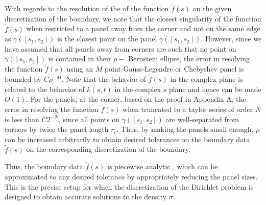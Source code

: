 \documentclass[12pt]{article}
\begin{document}
With regards to the resolution of the of the function $\tilde{f}(s)$ on the given discretization of the boundary, 
we note that the closest singularity of the function $\tilde{f}(s)$ when restricted to a panel away from the corner
and not on the same edge as $\gamma([s_{1},s_{2}])$ is the closest point on the panel $\gamma([s_{1},s_{2}])$. 
However, since we have assumed that all panels away from corners are such that no point on $\gamma([s_{1},s_{2}])$ 
is contained in their $\rho-$ Bernstein ellipse, the error in resolving the function $\tilde{f}(s)$ using an $M$ point Gauss-Legendre
or Chebyshev panel is bounded by $C \rho^{-M}$. Note that the behavior of $\tilde{f}(s)$ in the complex plane is related
to the behavior of $k(s,t)$ in the complex $s$ plane and hence can be made $O(1)$.
For the panels, at the corner, based on the proof in Appendix A, the error in resolving the function $\tilde{f}(s)$ when
truncated to a taylor series of order $N$ is less than $C 2^{-N}$, since all points on $\gamma([s_{1},s_{2}])$ are 
well-separated from corners by twice the panel length $r_{c}$. Thus, by making the panels small enough, $\rho$ can be increased arbitrarily to obtain desired tolerances on the boundary data $\tilde{f}(s)$ on the corresponding discretization of the boundary. 
 
 Thus, the boundary data $\tilde{f}(s)$ is piecewise analytic , which can be approximated to any desired tolerance by appropriately reducing the panel sizes. This is the precise setup for which the discretization of the Dirichlet problem is designed to obtain accurate solutions to the density $\tilde{\sigma}$. 
 
 
 
\end{document}
